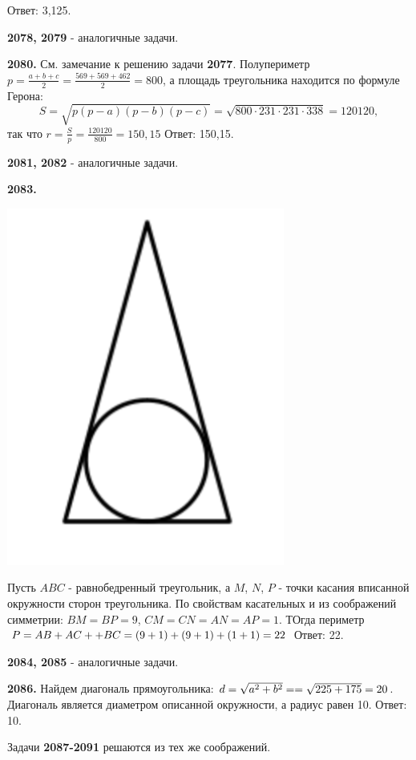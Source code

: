  \null \hspace*{\fill} Ответ: 3,125.

\textbf{2078, 2079} - аналогичные задачи. 

\textbf{2080.} См. замечание к решению задачи \textbf{2077}.   Полупериметр \linebreak$p = \frac{a+b+c}{2} = \frac{569+569+462}{2}=800$, а площадь треугольника находится по формуле Герона:
\[
S = \sqrt{p(p-a)(p-b)(p-c)} = \sqrt{800\cdot231\cdot231\cdot338} = 120120,
\]
так что $r = \frac{S}{p} = \frac{120120}{800} = 150,15$ \newline \null \hspace*{\fill} Ответ: 150,15.

\textbf{2081, 2082} - аналогичные задачи.

\textbf{2083.}

{\centering \includegraphics[width=0.35\linewidth]{Geometry/Content/39.png}
	
}

Пусть $ABC$ - равнобедренный треугольник, а $M$, $N$, $P$ - точки касания вписанной окружности сторон треугольника. По свойствам касательных и из соображений симметрии: $BM = BP = 9$, $CM = CN = AN = AP = 1$. ТОгда периметр $P = AB + AC + \linebreak+BC = (9 + 1) + (9 + 1) + (1 + 1) = 22$ \newline \null \hspace*{\fill} Ответ: 22.

\textbf{2084, 2085} - аналогичные задачи.

\textbf{2086.} Найдем диагональ прямоугольника: $d = \sqrt{a^2+b^2} = \linebreak = \sqrt{225+175} = 20$.  Диагональ является диаметром описанной окружности, а радиус равен 10. \newline \null \hspace*{\fill} Ответ: 10.

Задачи \textbf{2087-2091} решаются из тех же соображений.

